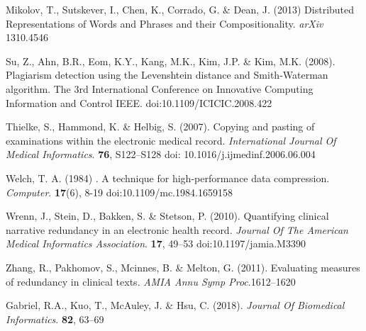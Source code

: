\documentclass[runningheads,a4paper]{llncs}
\begin{document}
\begin{thebibliography}{50}
Mikolov, T., Sutskever, I., Chen, K., Corrado, G. \& Dean, J. (2013) Distributed Representations of Words and Phrases and their Compositionality. {\em arXiv} 1310.4546  

Su, Z., Ahn, B.R., Eom, K.Y., Kang, M.K., Kim, J.P. \& Kim, M.K. (2008). Plagiarism detection using the Levenshtein distance and Smith-Waterman algorithm. The 3rd International Conference on Innovative Computing Information and Control IEEE. doi:10.1109/ICICIC.2008.422 

Thielke, S., Hammond, K. \& Helbig, S. (2007). Copying and pasting of examinations within the electronic medical record.  {\em International Journal Of Medical Informatics}. \textbf{76}, S122--S128 doi: 10.1016/j.ijmedinf.2006.06.004

Welch, T. A. (1984) . A technique for high-performance data compression. {\em Computer}. \textbf{17}(6), 8-19 doi:10.1109/mc.1984.1659158

Wrenn, J., Stein, D., Bakken, S. \& Stetson, P. (2010). Quantifying clinical narrative redundancy in an electronic health record.  {\em Journal Of The American Medical Informatics Association}. \textbf{17}, 49--53 doi:10.1197/jamia.M3390

Zhang, R., Pakhomov, S., Mcinnes, B. \& Melton, G. (2011). Evaluating measures of redundancy in clinical texts. {\em AMIA Annu Symp Proc}.1612--1620 

Gabriel, R.A., Kuo, T.,  McAuley, J. \& Hsu, C. (2018). {\em Journal Of Biomedical Informatics}. \textbf{82}, 63--69
\end{thebibliography}
\end{document}

